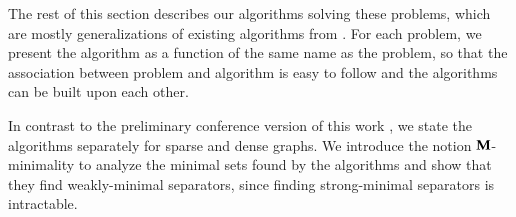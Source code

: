 The rest of this section describes our algorithms solving these problems, which are mostly 
%
%
 generalizations of existing algorithms from
\citep{Acid1996,Shachter1998,TianPP1998,TextorLiskiewicz2011}. For each problem, we present the algorithm as a function of the same name as the problem, so that the association between problem and algorithm is easy to follow and the algorithms can be built upon each other.

In contrast to the preliminary conference version of this work \cite{zander2014constructing}, we state the algorithms separately for sparse and dense graphs. We introduce the notion ${\bf M}$-minimality to analyze the minimal sets found by the algorithms and show that they find weakly-minimal separators, since finding strong-minimal separators is intractable. %

%
%
%
%
%
%
%



